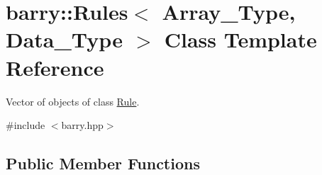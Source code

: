 \hypertarget{classbarry_1_1_rules}{}\section{barry\+:\+:Rules$<$ Array\+\_\+\+Type, Data\+\_\+\+Type $>$ Class Template Reference}
\label{classbarry_1_1_rules}


Vector of objects of class \hyperlink{classbarry_1_1_rule}{Rule}.  




{\ttfamily \#include $<$barry.\+hpp$>$}

\subsection*{Public Member Functions}
